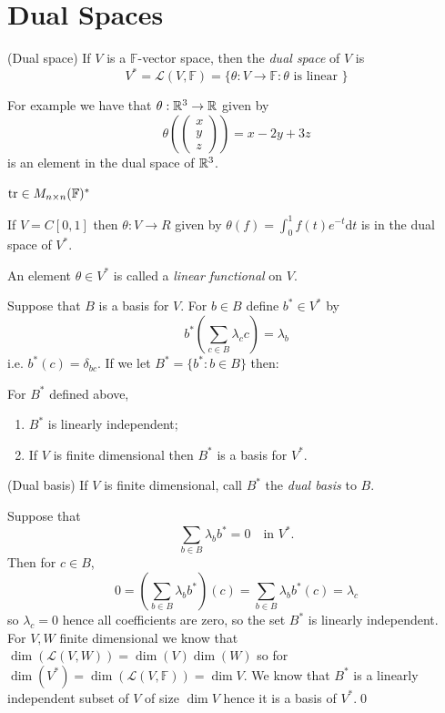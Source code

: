 \documentclass{article}
\newcommand{\F}{\mathbb{F}}
\begin{document}
\section{Dual Spaces}
\begin{definition}
	(Dual space) If $ V $ is a $ \F $-vector space, then the \textit{dual space} of $ V $ is
	\[
		V^*=\mathcal L(V,\F)=\{\theta:V\to\F: \theta\text{ is linear }\}
	\]
\end{definition}
For example we have that $ \theta:\mathbb{R}^3\to \mathbb{R} $ given by
\[
  \theta\left(\begin{pmatrix}
    x \\ y \\ z
  \end{pmatrix}\right) = x-2y+3z
\]
is an element in the dual space of $ \mathbb{R}^3 $.\par
$ \tr\in M_{n\times n}(\F)^* $\par
If $ V=C[0,1] $ then $ \theta:V\to R $ given by $ \theta(f)=\int_0^1f(t)e^{-t}\mathrm dt $ is in the dual space of $ V^* $.\par
An element $ \theta\in V^* $ is called a \textit{linear functional} on $ V $.\par
Suppose that $ B $ is a basis for $ V $. For $ b\in B $ define $ b^*\in V^* $ by
\[
	b^*\left(\sum_{c\in B}\lambda_cc\right)=\lambda_b
\]
i.e. $ b^*(c)=\delta_{bc} $. If we let $B^*=\{b^*:b\in B\} $ then:
\begin{proposition}
  For $ B^* $ defined above,
  \begin{enumerate}
	  \item $ B^* $ is linearly independent;
	  \item If $ V $ is finite dimensional then $ B^* $ is a basis for $ V^* $.
  \end{enumerate}
\end{proposition}
\begin{definition}
	(Dual basis) If $ V $ is finite dimensional, call $ B^* $ the \textit{dual basis} to $ B $.
\end{definition}
\pf Suppose that
\[
	\sum_{b\in B}\lambda_bb^*=0\quad\text{in } V^*.
\]
Then for $ c\in B $,
\[
	0=\left(\sum_{b\in B}\lambda_bb^*\right)(c)=\sum_{b\in B}\lambda_bb^*(c)=\lambda_c
\]
so $ \lambda_c=0 $ hence all coefficients are zero, so the set $ B^* $ is linearly independent.\\
For $ V,W $ finite dimensional we know that $ \dim(\mathcal L(V,W))=\dim(V)\dim(W) $ so for $ \dim(V^*)=\dim(\mathcal L(V,\F))=\dim V $. We know that $ B^* $ is a linearly independent subset of $ V $ of size $ \dim V $ hence it is a basis of $ V^* $.\qed\par
\end{document}
